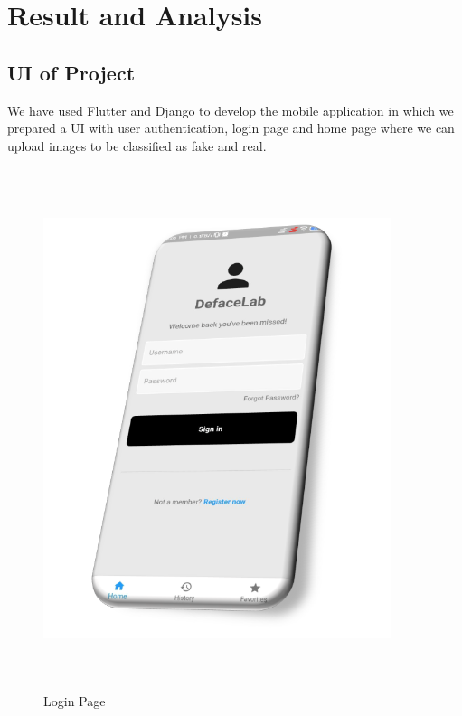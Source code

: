 \section{Result and Analysis}
\subsection{UI of Project}
We have used Flutter and Django to develop the mobile application in which we prepared a
UI with user authentication, login page and home page where we can upload images to be classified as fake and real.

\begin{figure}[ht]
    \centering
    \includegraphics[width= 4in, height =6in ]{img/loginpagev2.png}
    \caption{Login Page }
\end{figure}

